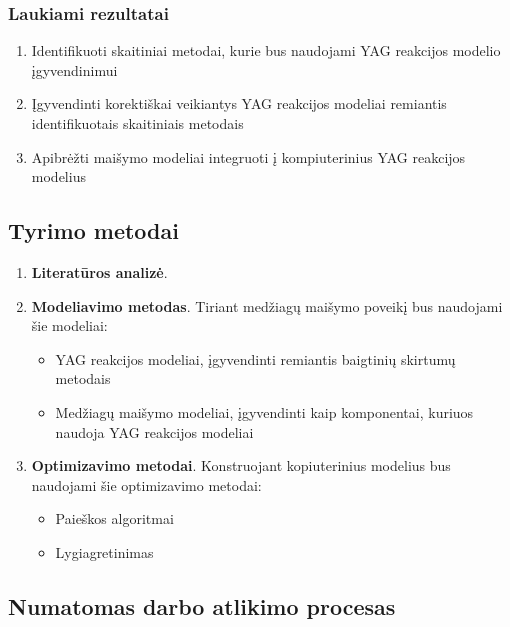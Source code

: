 \documentclass[]{VUMIFTemplateClass}
\begin{document}
\subsubsection{Laukiami rezultatai}
\begin{enumerate}
    \item Identifikuoti skaitiniai metodai, kurie bus naudojami YAG reakcijos modelio įgyvendinimui

    \item Įgyvendinti korektiškai veikiantys YAG reakcijos modeliai remiantis identifikuotais skaitiniais metodais

    \item Apibrėžti maišymo modeliai integruoti į kompiuterinius YAG reakcijos modelius

\end{enumerate}

\newpage

\subsection{Tyrimo metodai}

\begin{enumerate}
    \item \textbf{Literatūros analizė}.
    \item \textbf{Modeliavimo metodas}. Tiriant medžiagų maišymo poveikį bus naudojami šie modeliai:
    \begin{itemize}
        \item YAG reakcijos modeliai, įgyvendinti remiantis baigtinių skirtumų metodais
        \item Medžiagų maišymo modeliai, įgyvendinti kaip komponentai, kuriuos naudoja YAG reakcijos modeliai 
    \end{itemize}
    \item \textbf{Optimizavimo metodai}. Konstruojant kopiuterinius modelius bus naudojami šie optimizavimo metodai:
    \begin{itemize}
        \item Paieškos algoritmai
        \item Lygiagretinimas
    \end{itemize}
\end{enumerate}


\subsection{Numatomas darbo atlikimo procesas}
\end{document}
